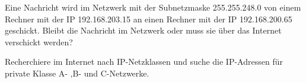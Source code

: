 \documentclass[10pt, a4paper]{arbeitsblatt}
\begin{document}
\begin{aufgabe}
	Eine Nachricht wird im Netzwerk mit der Subnetzmaske 255.255.248.0 von einem Rechner mit der IP 192.168.203.15 an einen Rechner mit der IP 192.168.200.65 geschickt. Bleibt die Nachricht im Netzwerk oder muss sie über das Internet verschickt werden?
\end{aufgabe}

\begin{aufgabe}
	Recherchiere im Internet nach IP-Netzklassen und suche die IP-Adressen für private Klasse A- ,B- und C-Netzwerke.
\end{aufgabe}
\end{document}
